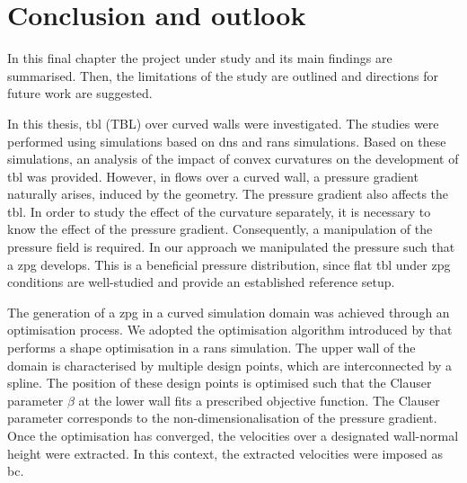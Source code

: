 \chapter{Conclusion and outlook} \label{chap:summary}

In this final chapter the project under study and its main findings are summarised.
Then, the limitations of the study are outlined and directions for future work are suggested. 

In this thesis, \acrlong{tbl} (TBL) over curved walls were investigated.
The studies were performed using simulations based on \acrfull{dns} and \acrfull{rans} simulations.
Based on these simulations, an analysis of the impact of convex curvatures on the development of \acrshort{tbl} was provided.
However, in flows over a curved wall, a pressure gradient naturally arises, induced by the geometry.
The pressure gradient also affects the \acrlong{tbl}.
In order to study the effect of the curvature separately, it is necessary to know the effect of the pressure gradient.
Consequently, a manipulation of the pressure field is required.
In our approach we manipulated the pressure such that a \acrfull{zpg} develops.
This is a beneficial pressure distribution, since flat \acrshort{tbl} under \acrshort{zpg} conditions are well-studied and provide an established reference setup.


The generation of a \acrshort{zpg} in a curved simulation domain was achieved through an optimisation process.
We adopted the optimisation algorithm introduced by \citet{morita_applying_2022} that performs a shape optimisation in a \acrshort{rans} simulation.
The upper wall of the domain is characterised by multiple design points, which are interconnected by a spline.
The position of these design points is optimised such that the Clauser parameter $\beta$ at the lower wall fits a prescribed objective function.
The Clauser parameter corresponds to the non-dimensionalisation of the pressure gradient.
Once the optimisation has converged, the velocities over a designated wall-normal height were extracted.
In this context, the extracted velocities were imposed as  \acrfull{bc}.
%

